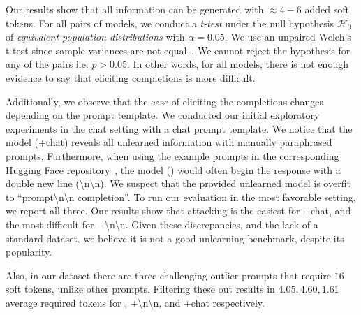 Our results show that all information can be generated with $\approx 4-6$ added soft tokens.
For all pairs of models, we conduct a \emph{t-test} under the null hypothesis $\mathcal{H}_0$ of \emph{equivalent population distributions} with $\alpha=0.05$.
We use an unpaired Welch's t-test since sample variances are not equal~\cite{welch1947ttest}.
We cannot reject the hypothesis for any of the pairs i.e. $p>0.05$.
In other words, for all models, there is not enough evidence to say that eliciting completions is more difficult.

Additionally, we observe that the ease of eliciting the completions changes depending on the prompt template.
We conducted our initial exploratory experiments in the chat setting with a chat prompt template.
We notice that the model (\whp+chat) reveals all unlearned information with manually paraphrased prompts.
Furthermore, when using the example prompts in the corresponding Hugging Face repository~\cite{eldan2023harrypotter-hf}, the model (\whp) would often begin the response with a double new line (\textbackslash n\textbackslash n).
We suspect that the provided unlearned model is overfit to ``prompt\textbackslash n\textbackslash n completion''.
To run our evaluation in the most favorable setting, we report all three.
Our results show that attacking is the easiest for \whp+chat, and the most difficult for \whp+\textbackslash n\textbackslash n.
Given these discrepancies, and the lack of a standard \whp dataset, we believe it is not a good unlearning benchmark, despite its popularity.

Also, in our dataset there are three challenging outlier prompts that require $16$ soft tokens, unlike other prompts.
Filtering these out results in $4.05, 4.60, 1.61$ average required tokens for \whp, \whp+\textbackslash n\textbackslash n, and \whp+chat respectively.

